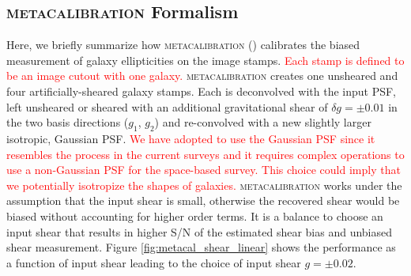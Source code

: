 \documentclass[fleqn,usenatbib]{mnras}
\begin{document}
\subsection{\textsc{metacalibration} Formalism}
Here, we briefly summarize how \textsc{metacalibration} (\citealt{2017arXiv170202600H, 2017ApJ...841...24S}) calibrates the biased measurement of galaxy ellipticities on the image stamps. \textcolor{red}{Each stamp is defined to be an image cutout with one galaxy.} \textsc{metacalibration} creates one unsheared and four artificially-sheared galaxy stamps. Each is deconvolved with the input PSF, left unsheared or sheared with an additional gravitational shear of $\delta g=\pm 0.01$ in the two basis directions ($g_1$, $g_2$) and re-convolved with a new slightly larger isotropic, Gaussian PSF. \textcolor{red}{We have adopted to use the Gaussian PSF since it resembles the process in the current surveys and it requires complex operations to use a non-Gaussian PSF for the space-based survey. This choice could imply that we potentially isotropize the shapes of galaxies.} \textsc{metacalibration} works under the assumption that the input shear is small, otherwise the recovered shear would be biased without accounting for higher order terms. It is a balance to choose an input shear that results in higher S/N of the estimated shear bias  and unbiased shear measurement. Figure \ref{fig:metacal_shear_linear} shows the performance as a function of input shear leading to the choice of input shear $g=\pm 0.02$. 
\end{document}
